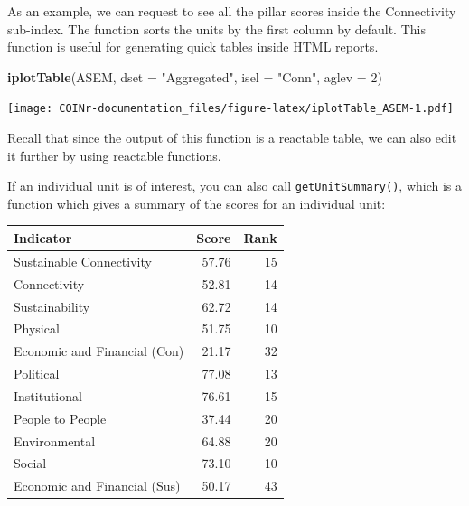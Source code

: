 \documentclass[
]{book}
\newenvironment{Shaded}{\begin{snugshade}}{\end{snugshade}}
\newcommand{\DataTypeTok}[1]{\textcolor[rgb]{0.13,0.29,0.53}{#1}}
\newcommand{\DecValTok}[1]{\textcolor[rgb]{0.00,0.00,0.81}{#1}}
\newcommand{\KeywordTok}[1]{\textcolor[rgb]{0.13,0.29,0.53}{\textbf{#1}}}
\newcommand{\NormalTok}[1]{#1}
\newcommand{\OperatorTok}[1]{\textcolor[rgb]{0.81,0.36,0.00}{\textbf{#1}}}
\newcommand{\StringTok}[1]{\textcolor[rgb]{0.31,0.60,0.02}{#1}}
\begin{document}
As an example, we can request to see all the pillar scores inside the Connectivity sub-index. The function sorts the units by the first column by default. This function is useful for generating quick tables inside HTML reports.

\begin{Shaded}
\begin{Highlighting}[]
\KeywordTok{iplotTable}\NormalTok{(ASEM, }\DataTypeTok{dset =} \StringTok{"Aggregated"}\NormalTok{, }\DataTypeTok{isel =} \StringTok{"Conn"}\NormalTok{, }\DataTypeTok{aglev =} \DecValTok{2}\NormalTok{)}
\end{Highlighting}
\end{Shaded}

\texttt{[image: COINr-documentation\_files/figure-latex/iplotTable\_ASEM-1.pdf]}

Recall that since the output of this function is a reactable table, we can also edit it further by using reactable functions.

If an individual unit is of interest, you can also call \texttt{getUnitSummary()}, which is a function which gives a summary of the scores for an individual unit:

\begin{Shaded}
\end{Shaded}

\begin{tabular}{l|r|r}
\hline
Indicator & Score & Rank\\
\hline
Sustainable Connectivity & 57.76 & 15\\
\hline
Connectivity & 52.81 & 14\\
\hline
Sustainability & 62.72 & 14\\
\hline
Physical & 51.75 & 10\\
\hline
Economic and Financial (Con) & 21.17 & 32\\
\hline
Political & 77.08 & 13\\
\hline
Institutional & 76.61 & 15\\
\hline
People to People & 37.44 & 20\\
\hline
Environmental & 64.88 & 20\\
\hline
Social & 73.10 & 10\\
\hline
Economic and Financial (Sus) & 50.17 & 43\\
\hline
\end{tabular}
\end{document}

